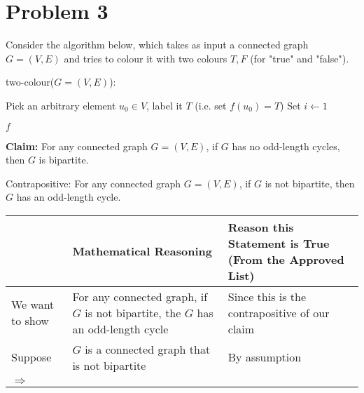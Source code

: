 \documentclass{article}
\begin{document}
\section{Problem 3}

\noindent Consider the algorithm below, which takes as input a connected graph $G=(V,E)$ and tries to colour it with two colours ${T,F}$ (for "true" and "false").\vspace{15pt}



\begin{algorithm}
    \caption{two-colour($G=(V,E)$):}

    \BlankLine
    Pick an arbitrary element $u_0\in V$, label it $T$ (i.e. set $f(u_0)=T$)\;
    Set $i\leftarrow 1$\;

    \BlankLine

    \BlankLine
    \Return $f$\;
\end{algorithm}


\noindent\textbf{Claim:} For any connected graph $G=(V,E)$, if $G$ has no odd-length cycles, then $G$ is bipartite.\vspace{15pt}


Contrapositive: For any connected graph $G=(V,E)$, if $G$ is not bipartite, then $G$ has an odd-length cycle.
\vspace{15pt}

\begin{adjustwidth}{-1.5cm}{}
	\begin{sloppypar}
		\begin{tabular}{|p{1.5cm}|p{6.6cm}|p{5.5cm}|}
		\hline
		& \textbf{Mathematical Reasoning} & \textbf{Reason this Statement is True (From the Approved List)} \\
		\hline
		We want to show & For any connected graph, if $G$ is not bipartite, the $G$ has an odd-length cycle  & Since this is the contrapositive of our claim \\
		\hline
		Suppose & $G$ is a connected graph that is not bipartite & By assumption \\
		\hline
		$\Rightarrow$ & & \\
		\hline
		\end{tabular}
	\end{sloppypar}
\end{adjustwidth}


\pagebreak
\end{document}
